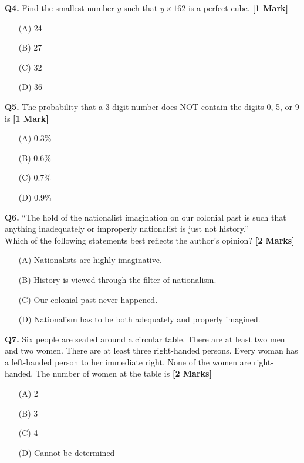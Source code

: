 \documentclass[11pt]{article}
\newcommand{\questiona}[2]{
    \noindent\textbf{Q#2.} #1 \hfill \textbf{[1 Mark]}
}
\newcommand{\questionb}[2]{
    \noindent\textbf{Q#2.} #1 \hfill \textbf{[2 Marks]}
}
\begin{document}
\questiona{Find the smallest number \( y \) such that \( y \times 162 \) is a perfect cube.}{4}
\begin{enumerate}
    \item[(A)] 24  
    \item[(B)] 27  
    \item[(C)] 32  
    \item[(D)] 36  
\end{enumerate}
\vspace{0.5cm}

\questiona{The probability that a 3-digit number does NOT contain the digits 0, 5, or 9 is}{5}
\begin{enumerate}
    \item[(A)] 0.3\%  
    \item[(B)] 0.6\%  
    \item[(C)] 0.7\%  
    \item[(D)] 0.9\%  
\end{enumerate}
\vspace{0.5cm}

\questionb{“The hold of the nationalist imagination on our colonial past is such that anything inadequately or improperly nationalist is just not history.”\\
Which of the following statements best reflects the author’s opinion?}{6}
\begin{enumerate}
    \item[(A)] Nationalists are highly imaginative.  
    \item[(B)] History is viewed through the filter of nationalism.  
    \item[(C)] Our colonial past never happened.  
    \item[(D)] Nationalism has to be both adequately and properly imagined.  
\end{enumerate}
\vspace{0.5cm}

\questionb{Six people are seated around a circular table. There are at least two men and two women. There are at least three right-handed persons. Every woman has a left-handed person to her immediate right. None of the women are right-handed. The number of women at the table is}{7}
\begin{enumerate}
    \item[(A)] 2  
    \item[(B)] 3  
    \item[(C)] 4  
    \item[(D)] Cannot be determined  
\end{enumerate}
\vspace{0.5cm}
\end{document}

